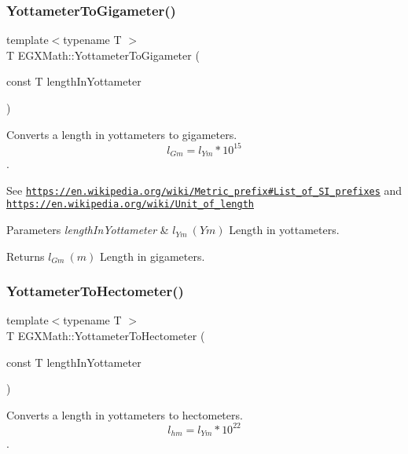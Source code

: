 \subsubsection{\texorpdfstring{Yottameter\+To\+Gigameter()}{YottameterToGigameter()}}
{\footnotesize\ttfamily template$<$typename T $>$ \\
T E\+G\+X\+Math\+::\+Yottameter\+To\+Gigameter (\begin{DoxyParamCaption}\item[{const T}]{length\+In\+Yottameter }\end{DoxyParamCaption})}



Converts a length in yottameters to gigameters. \[ l_{Gm}=l_{Ym} * 10^{15} \]. 

See \href{https://en.wikipedia.org/wiki/Metric_prefix#List_of_SI_prefixes}{\tt https\+://en.\+wikipedia.\+org/wiki/\+Metric\+\_\+prefix\#\+List\+\_\+of\+\_\+\+S\+I\+\_\+prefixes} and \href{https://en.wikipedia.org/wiki/Unit_of_length}{\tt https\+://en.\+wikipedia.\+org/wiki/\+Unit\+\_\+of\+\_\+length} 
\begin{DoxyParams}{Parameters}
{\em length\+In\+Yottameter} & $ l_{Ym}\ (Ym)$ Length in yottameters. \\
\hline
\end{DoxyParams}
\begin{DoxyReturn}{Returns}
$ l_{Gm}\ (m)$ Length in gigameters. 
\end{DoxyReturn}
\mbox{\label{group___e_g_x_math-_conversions-_length_conversions-_yottameter-_s_i_ga3c7aed6e299bc4f0288d0672a7262320}} 
\subsubsection{\texorpdfstring{Yottameter\+To\+Hectometer()}{YottameterToHectometer()}}
{\footnotesize\ttfamily template$<$typename T $>$ \\
T E\+G\+X\+Math\+::\+Yottameter\+To\+Hectometer (\begin{DoxyParamCaption}\item[{const T}]{length\+In\+Yottameter }\end{DoxyParamCaption})}



Converts a length in yottameters to hectometers. \[ l_{hm}=l_{Ym} * 10^{22} \]. 

